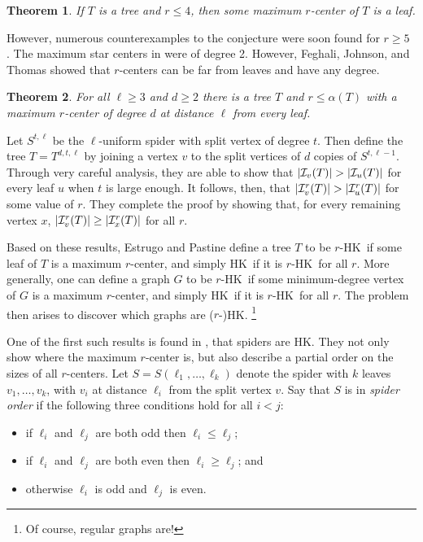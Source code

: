 \documentclass{article}
\newtheorem{thm}{Theorem}%
\def\a{{\alpha}}
\def\cI{{\cal I}}
\def\hk{{\sf HK}}
\begin{document}
\begin{thm}
\label{t:SmallrHK}
If $T$ is a tree and $r\le 4$, then some maximum $r$-center of $T$ is a leaf.
\end{thm}

However, numerous counterexamples to the conjecture were soon found for $r\ge 5$ \cite{Baber,BorgStars,FegJohTho}.
The maximum star centers in \cite{Baber,BorgStars} were of degree 2.
However, Feghali, Johnson, and Thomas \cite{FegJohTho} showed that $r$-centers can be far from leaves and have any degree.

\begin{thm}
\label{t:DeepCenters}
For all $\ell\ge 3$ and $d\ge 2$ there is a tree $T$ and $r\le\a(T)$ with a maximum $r$-center of degree $d$ at distance $\ell$ from every leaf.
\end{thm}

Let $S^{t,\ell}$ be the $\ell$-uniform spider with split vertex of degree $t$.
Then define the tree $T=T^{d,t,\ell}$ by joining a vertex $v$ to the split vertices of $d$ copies of $S^{t,\ell-1}$.
Through very careful analysis, they are able to show that $|\cI_v(T)|>|\cI_u(T)|$ for every leaf $u$ when $t$ is large enough.
It follows, then, that $|\cI_v^r(T)|>|\cI_u^r(T)|$ for some value of $r$.
They complete the proof by showing that, for every remaining vertex $x$, $|\cI_v^r(T)|\ge |\cI_x^r(T)|$ for all $r$.

Based on these results, Estrugo and Pastine \cite{EstrPast} define a tree $T$ to be $r$-\hk\ if some leaf of $T$ is a maximum $r$-center, and simply \hk\ if it is $r$-\hk\ for all $r$.
More generally, one can define a graph $G$ to be $r$-\hk\ if some minimum-degree vertex of $G$ is a maximum $r$-center, and simply \hk\ if it is $r$-\hk\ for all $r$.
The problem then arises to discover which graphs are ($r$-)\hk.%
\footnote{Of course, regular graphs are!}

One of the first such results is found in \cite{HurlKamaTrees}, that spiders are \hk.
They not only show where the maximum $r$-center is, but also describe a partial order on the sizes of all $r$-centers.
Let $S=S(\ell_1,\ldots,\ell_k)$ denote the spider with $k$ leaves $v_1,\ldots,v_k$, with $v_i$ at distance $\ell_i$ from the split vertex $v$.
Say that $S$ is in {\it spider order} if the following three conditions hold for all $i<j$:
\begin{itemize}
    \item 
    if $\ell_i$ and $\ell_j$ are both odd then $\ell_i\le \ell_j$;
    \item 
    if $\ell_i$ and $\ell_j$ are both even then $\ell_i\ge \ell_j$; and
    \item 
    otherwise $\ell_i$ is odd and $\ell_j$ is even.
\end{itemize}
\end{document}
